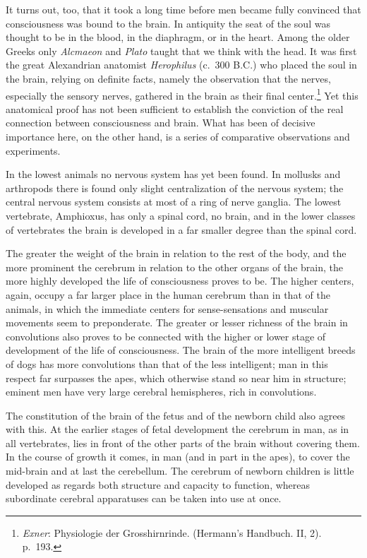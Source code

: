 \documentclass[12pt,a4paper]{book}
\newcommand{\opage}[1]{\marginnote{\footnotesize\textit{[#1]}}}
\begin{document}
It turns out, too, that it took a long time before men became fully
convinced that consciousness was bound to the brain. In antiquity the
seat of the soul was thought to be in the blood, in the diaphragm, or in
the heart. Among the older Greeks only \emph{Alcmaeon} and \emph{Plato}
taught that we think with the head. It was first the great Alexandrian
anatomist \emph{Herophilus}
\opage{65}(c.~300 B.C.) who placed the soul in the brain, relying on
definite facts, namely the observation that the nerves, especially the
sensory nerves, gathered in the brain as their final
center.\footnote{\emph{Exner}: Physiologie der Grosshirnrinde.
(Hermann's Handbuch. II, 2). p.~193.} Yet this anatomical proof has not
been sufficient to establish the conviction of the real connection
between consciousness and brain. What has been of decisive importance
here, on the other hand, is a series of comparative observations and
experiments.

In the lowest animals no nervous system has yet been found. In mollusks
and arthropods there is found only slight centralization of the nervous
system; the central nervous system consists at most of a ring of nerve
ganglia. The lowest vertebrate, Amphioxus, has only a spinal cord, no
brain, and in the lower classes of vertebrates the brain is developed in
a far smaller degree than the spinal cord.

The greater the weight of the brain in relation to the rest of the body,
and the more prominent the cerebrum in relation to the other organs of
the brain, the more highly developed the life of consciousness proves to
be. The higher centers, again, occupy a far larger place in the human
cerebrum than in that of the animals, in which the immediate centers for
sense-sensations and muscular movements seem to preponderate. The
greater or lesser richness of the brain in convolutions also proves to
be connected with the higher or lower stage of development of the life
of consciousness. The brain of the more intelligent breeds of dogs has
more convolutions than that of the less intelligent; man in this
respect far surpasses the apes, which otherwise stand so near him in
structure; eminent men have very large cerebral hemispheres, rich in
convolutions.

The constitution of the brain of the fetus and of the newborn child also
agrees with this. At the earlier stages of fetal development the
cerebrum in man, as in all vertebrates, lies in front of the other parts
of the brain without covering them. In the course of growth it comes, in
man (and in part in the apes), to cover the mid-brain and at last the
cerebellum. The cerebrum of newborn children is little developed as
regards both structure and
\opage{66}capacity to function, whereas subordinate cerebral apparatuses
can be taken into use at once.
\end{document}
